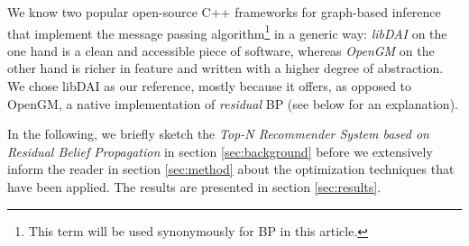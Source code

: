 We know two popular open-source C++ frameworks for graph-based inference that implement the message passing algorithm\footnote{This term will be used synonymously for BP in this article.} in a generic way: \textit{libDAI} \cite{Mooij_libDAI_10} on the one hand is a clean and accessible piece of software, whereas \textit{OpenGM} \cite{andres2012opengm} on the other hand is richer in feature and written with a higher degree of abstraction. We chose libDAI as our reference, mostly because it offers, as opposed to OpenGM, a native implementation of \textit{residual} BP (see below for an explanation). 

In the following, we briefly sketch the \textit{Top-N Recommender System based on Residual Belief Propagation} in section \ref{sec:background} before we extensively inform the reader in section \ref{sec:method} about the optimization techniques that have been applied. The results are presented in section \ref{sec:results}.